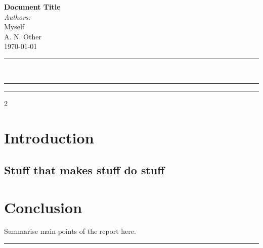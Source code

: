 \documentclass[a4paper,10pt]{article}
\begin{document}
\begin{center}
	{ \huge \bfseries Document Title}\\[0.3cm]
	\emph{Authors:}\\
	Myself\\
	A. N. Other\\[0.5cm]
	\today
\end{center}

\noindent\rule{\linewidth}{0.2ex}
\textit{\lipsum[1]}\\
\noindent\rule{\linewidth}{0.2ex}
\tableofcontents
\noindent\rule{\linewidth}{0.2ex}
\begin{multicols}{2}


\section{Introduction}
\lipsum 
\subsection{Stuff that makes stuff do stuff}
\lipsum

\section{Conclusion}

Summarise main points of the report here.

\noindent\rule{\linewidth}{0.2ex}
\end{multicols}
\end{document}
